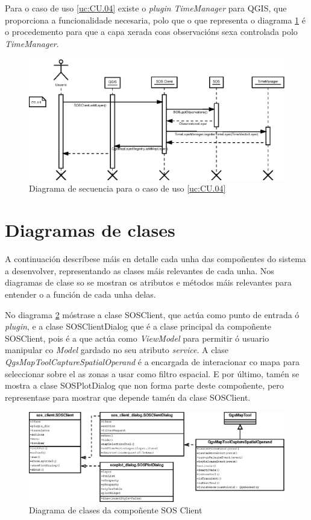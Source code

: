 Para o caso de uso \ref{uc:CU.04} existe o \emph{plugin} \emph{TimeManager} para QGIS, que proporciona a funcionalidade necesaria, polo que o que representa o diagrama \ref{fig:diaSeq4} é o procedemento para que a capa xerada coas observacións sexa controlada polo \emph{TimeManager}.
\begin{figure}
 \centering
 \includegraphics[width=\textwidth]{images/seq4.eps}
 \caption{Diagrama de secuencia para o caso de uso \ref{uc:CU.04}}
 \label{fig:diaSeq4}
\end{figure}

\section{Diagramas de clases}
A continuación descríbese máis en detalle cada unha das compoñentes do sistema a desenvolver, representando as clases máis relevantes de cada unha. Nos diagramas de clase so se mostran os atributos e métodos máis relevantes para entender o a función de cada unha delas.

No diagrama \ref{fig:diaClassSOSClient} móstrase a clase SOSClient, que actúa como punto de entrada ó \emph{plugin}, e a clase SOSClientDialog que é a clase principal da compoñente SOSClient, pois é a que actúa como \emph{ViewModel} para permitir ó usuario manipular co \emph{Model} gardado no seu atributo \emph{service}. A clase \emph{QgsMapToolCaptureSpatialOperand} é a encargada de interacionar co mapa para seleccionar sobre el as zonas a usar como filtro espacial. E por último, tamén se mostra a clase SOSPlotDialog que non forma parte deste compoñente, pero representase para mostrar que depende tamén da clase SOSClient.

\begin{figure}
 \centering
 \includegraphics[width=\textwidth]{images/clases_sos_client.eps}
 \caption{Diagrama de clases da compoñente SOS Client}
 \label{fig:diaClassSOSClient}
\end{figure}


